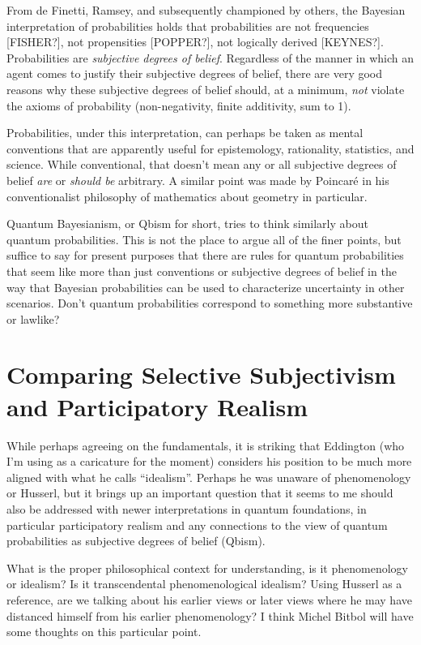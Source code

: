 From de Finetti, Ramsey, and subsequently championed by others, the Bayesian interpretation of probabilities holds that probabilities are not frequencies [FISHER?], not propensities [POPPER?], not logically derived [KEYNES?].  Probabilities are \emph{subjective degrees of belief}. Regardless of the manner in which an agent comes to justify their subjective degrees of belief, there are very good reasons why these subjective degrees of belief should, at a minimum, \emph{not} violate the axioms of probability (non-negativity, finite additivity, sum to 1).

Probabilities, under this interpretation, can perhaps be taken as mental conventions that are apparently useful for epistemology, rationality, statistics, and science.  While conventional, that doesn't mean any or all subjective degrees of belief \emph{are} or \emph{should be} arbitrary.  A similar point was made by Poincar\'e in his conventionalist philosophy of mathematics about geometry in particular.  

Quantum Bayesianism, or Qbism for short, tries to think similarly about quantum probabilities.  This is not the place to argue all of the finer points, but suffice to say for present purposes that there are rules for quantum probabilities that seem like more than just conventions or subjective degrees of belief in the way that Bayesian probabilities can be used to characterize uncertainty in other scenarios.  Don't quantum probabilities correspond to something more substantive or lawlike?


\section{Comparing Selective Subjectivism and Participatory Realism}

While perhaps agreeing on the fundamentals, it is striking that Eddington (who I'm using as a caricature for the moment) considers his position to be much more aligned with what he calls ``idealism''.  Perhaps he was unaware of phenomenology or Husserl, but it brings up an important question that it seems to me should also be addressed with newer interpretations in quantum foundations, in particular participatory realism and any connections to the view of quantum probabilities as subjective degrees of belief (Qbism).

What is the proper philosophical context for understanding, is it phenomenology or idealism?  Is it transcendental phenomenological idealism?  Using Husserl as a reference, are we talking about his earlier views or later views where he may have distanced himself from his earlier phenomenology?  I think Michel Bitbol will have some thoughts on this particular point.


